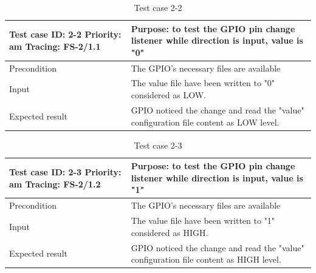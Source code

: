 \begin{table}[!h]
	\caption{Test case 2-2}
	\label{table:TCase-FS2-2}
	\begin{center}
		\renewcommand{\arraystretch}{1.8}
		\begin{tabu} 
			to 0.9 \textwidth
			{  X[0.4, c] X[c] }
			\toprule
			Test case ID: 2-2 \newline Priority: am \newline Tracing: FS-2/1.1 & Purpose: to test the GPIO pin change listener while direction is input, value is "0"  \\ \midrule
			Precondition                                                       & The GPIO's necessary files are available                                              \\
			Input                                                              & The value file have been written to "0" considered as LOW.                            \\
			Expected result                                                    & GPIO noticed the change and read the "value" configuration file content as LOW level. \\ \bottomrule
		\end{tabu}
	\end{center}
\end{table} 

\begin{table}[H]
	\caption{Test case 2-3}
	\label{table:TCase-FS2-3}
	\begin{center}
		\renewcommand{\arraystretch}{1.8}
		\begin{tabu} 
			to 0.9 \textwidth
			{  X[0.4, c] X[c] }
			\toprule
			Test case ID: 2-3 \newline Priority: am \newline Tracing: FS-2/1.2 & Purpose: to test the GPIO pin change listener while direction is input, value is "1"   \\ \midrule
			Precondition                                                       & The GPIO's necessary files are available                                               \\
			Input                                                              & The value file have been written to "1" considered as HIGH.                            \\
			Expected result                                                    & GPIO noticed the change and read the "value" configuration file content as HIGH level. \\ \bottomrule
		\end{tabu}
	\end{center}
\end{table} 

